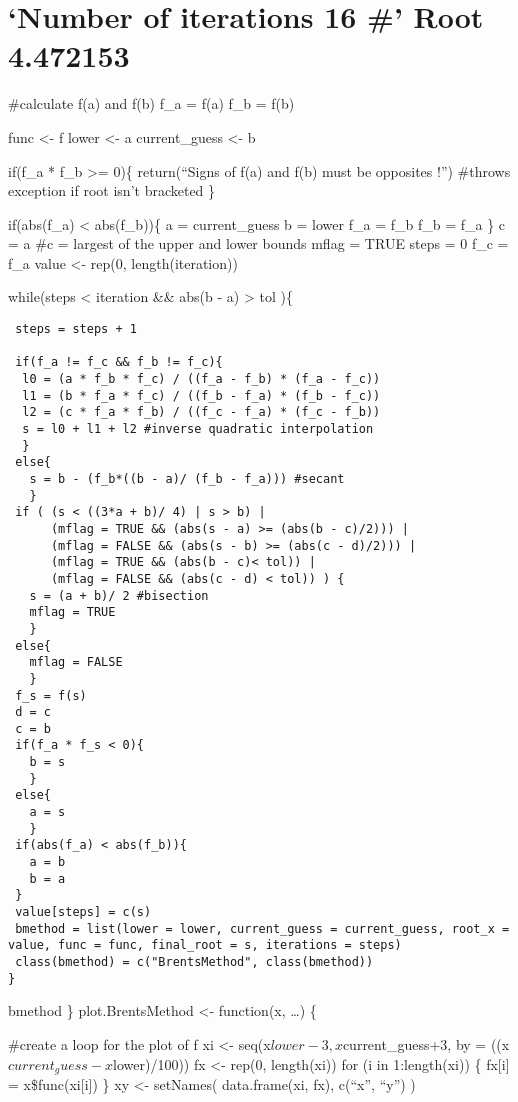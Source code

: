 \documentclass[]{article}
\begin{document}
{\section{\texorpdfstring{`Number of iterations 16 \#' Root
4.472153}{Number of iterations 16 \# Root 4.472153}}\label{number-of-iterations-16-root-4.472153}

\#calculate f(a) and f(b) f\_a = f(a) f\_b = f(b)

func \textless{}- f lower \textless{}- a current\_guess \textless{}- b

if(f\_a * f\_b \textgreater{}= 0)\{ return(``Signs of f(a) and f(b) must
be opposites !'') \#throws exception if root isn't bracketed \}

if(abs(f\_a) \textless{} abs(f\_b))\{ a = current\_guess b = lower f\_a
= f\_b f\_b = f\_a \} c = a \#c = largest of the upper and lower bounds
mflag = TRUE steps = 0 f\_c = f\_a value \textless{}- rep(0,
length(iteration))

while(steps \textless{} iteration \&\& abs(b - a) \textgreater{} tol )\{

\begin{verbatim}
 steps = steps + 1

 if(f_a != f_c && f_b != f_c){
  l0 = (a * f_b * f_c) / ((f_a - f_b) * (f_a - f_c))
  l1 = (b * f_a * f_c) / ((f_b - f_a) * (f_b - f_c))
  l2 = (c * f_a * f_b) / ((f_c - f_a) * (f_c - f_b))
  s = l0 + l1 + l2 #inverse quadratic interpolation
  }
 else{
   s = b - (f_b*((b - a)/ (f_b - f_a))) #secant
   }
 if ( (s < ((3*a + b)/ 4) | s > b) |
      (mflag = TRUE && (abs(s - a) >= (abs(b - c)/2))) |
      (mflag = FALSE && (abs(s - b) >= (abs(c - d)/2))) |
      (mflag = TRUE && (abs(b - c)< tol)) |
      (mflag = FALSE && (abs(c - d) < tol)) ) {
   s = (a + b)/ 2 #bisection
   mflag = TRUE
   }
 else{
   mflag = FALSE
   }
 f_s = f(s)
 d = c
 c = b
 if(f_a * f_s < 0){
   b = s
   }
 else{
   a = s
   }
 if(abs(f_a) < abs(f_b)){
   a = b
   b = a
 }
 value[steps] = c(s)
 bmethod = list(lower = lower, current_guess = current_guess, root_x = value, func = func, final_root = s, iterations = steps)
 class(bmethod) = c("BrentsMethod", class(bmethod))
}
\end{verbatim}

bmethod \} plot.BrentsMethod \textless{}- function(x, \ldots{}) \{

\#create a loop for the plot of f xi \textless{}-
seq(x\(lower-3, x\)current\_guess+3, by =
((x\(current_guess - x\)lower)/100)) fx \textless{}- rep(0, length(xi))
for (i in 1:length(xi)) \{ fx{[}i{]} = x\$func(xi{[}i{]}) \} xy
\textless{}- setNames( data.frame(xi, fx), c(``x'', ``y'') )

}
\end{document}
